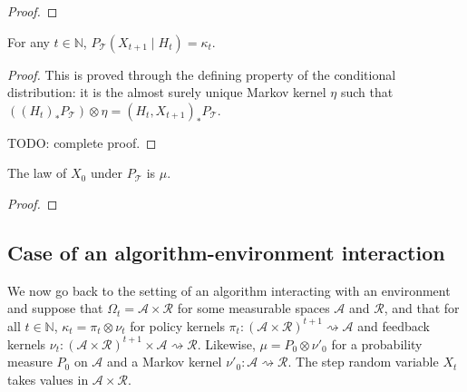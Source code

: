 \begin{proof}\leanok

\end{proof}


\begin{lemma}\label{lem:IT.condDistrib_X_add_one}
  \leanok
For any $t \in \mathbb{N}$, $P_{\mathcal{T}}\left(X_{t+1} \mid H_t\right) = \kappa_t$.
\end{lemma}

\begin{proof}\leanok
This is proved through the defining property of the conditional distribution: it is the almost surely unique Markov kernel $\eta$ such that $((H_t)_* P_{\mathcal{T}}) \otimes \eta = (H_t, X_{t+1})_*P_{\mathcal{T}}$.

TODO: complete proof.
\end{proof}


\begin{lemma}\label{lem:IT.law_X_zero}
  \leanok
The law of $X_0$ under $P_{\mathcal{T}}$ is $\mu$.
\end{lemma}

\begin{proof}\leanok

\end{proof}




\subsection{Case of an algorithm-environment interaction}

We now go back to the setting of an algorithm interacting with an environment and suppose that $\Omega_t = \mathcal{A} \times \mathcal{R}$ for some measurable spaces $\mathcal{A}$ and $\mathcal{R}$, and that for all $t \in \mathbb{N}$, $\kappa_t = \pi_t \otimes \nu_t$ for policy kernels $\pi_t : (\mathcal{A} \times \mathcal{R})^{t+1} \rightsquigarrow \mathcal{A}$ and feedback kernels $\nu_t : (\mathcal{A} \times \mathcal{R})^{t+1} \times \mathcal{A} \rightsquigarrow \mathcal{R}$.
Likewise, $\mu = P_0 \otimes \nu'_0$ for a probability measure $P_0$ on $\mathcal{A}$ and a Markov kernel $\nu'_0 : \mathcal{A} \rightsquigarrow \mathcal{R}$.
The step random variable $X_t$ takes values in $\mathcal{A} \times \mathcal{R}$.

